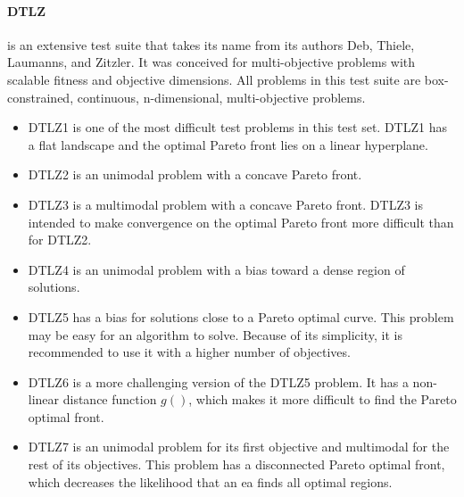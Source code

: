         \paragraph{DTLZ}\cite{DebTLZ05} is an extensive test suite that takes its name from its authors Deb, Thiele, Laumanns, and Zitzler. It was conceived for multi-objective problems with scalable fitness and objective dimensions.  All problems in this test suite are box-constrained, continuous, n-dimensional, multi-objective problems.
        \begin{itemize}
            \item DTLZ1  is one of the most difficult test problems in this test set. DTLZ1 has a flat landscape and the optimal Pareto front lies on a linear hyperplane. 
            \item DTLZ2 is an unimodal problem with a concave Pareto front.
            \item DTLZ3 is a multimodal problem with a concave Pareto front. DTLZ3 is intended to make convergence on the optimal Pareto front more difficult than for DTLZ2.
            \item DTLZ4 is an unimodal problem with a bias toward a dense region of solutions.
            \item DTLZ5 has a bias for solutions close to a Pareto optimal curve. This problem may be easy for an algorithm to solve. Because of its simplicity, it is recommended to use it with a higher number of objectives.
            \item DTLZ6 is a more challenging version of the DTLZ5 problem. It has a non-linear distance function $g()$, which makes it more difficult to find the Pareto optimal front.
            \item DTLZ7 is an unimodal problem for its first objective and multimodal for the rest of its objectives. This problem has a disconnected Pareto optimal front, which decreases the likelihood that an \gls{ea} finds all optimal regions.
        \end{itemize}

